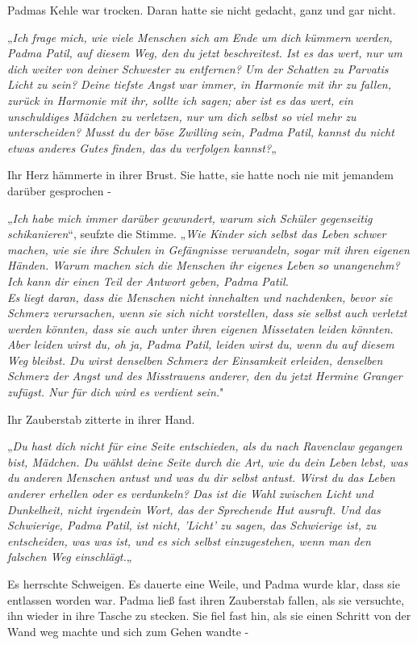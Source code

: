 {Padmas Kehle war trocken. Daran hatte sie nicht gedacht, ganz und gar nicht.

„\emph{Ich frage mich, wie viele Menschen sich am Ende um dich kümmern werden, Padma Patil, auf diesem Weg, den du jetzt beschreitest. Ist es das wert, nur um dich weiter von deiner Schwester zu entfernen? Um der Schatten zu Parvatis Licht zu sein? Deine tiefste Angst war immer, in Harmonie mit ihr zu fallen, zurück in Harmonie mit ihr, sollte ich sagen; aber ist es das wert, ein unschuldiges Mädchen zu verletzen, nur um dich selbst so viel mehr zu unterscheiden? Musst du der böse Zwilling sein, Padma Patil, kannst du nicht etwas anderes Gutes finden, das du verfolgen kannst?}„

Ihr Herz hämmerte in ihrer Brust. Sie hatte, sie hatte noch nie mit jemandem darüber gesprochen -

„\emph{Ich habe mich immer darüber gewundert, warum sich Schüler gegenseitig schikanieren}“, seufzte die Stimme. „\emph{Wie Kinder sich selbst das Leben schwer machen, wie sie ihre Schulen in Gefängnisse verwandeln, sogar mit ihren eigenen Händen. Warum machen sich die Menschen ihr eigenes Leben so unangenehm? Ich kann dir einen Teil der Antwort geben, Padma Patil.\\ } \emph{Es liegt daran, dass die Menschen nicht innehalten und nachdenken, bevor sie Schmerz verursachen, wenn sie sich nicht vorstellen, dass sie selbst auch verletzt werden könnten, dass sie auch unter ihren eigenen Missetaten leiden könnten.\\ Aber leiden wirst du, oh ja, Padma Patil, leiden wirst du, wenn du auf diesem Weg bleibst. Du wirst denselben Schmerz der Einsamkeit erleiden, denselben Schmerz der Angst und des Misstrauens anderer, den du jetzt Hermine Granger zufügst. Nur für dich wird es verdient sein.}"

Ihr Zauberstab zitterte in ihrer Hand.

„\emph{Du hast dich nicht für eine Seite entschieden, als du nach Ravenclaw gegangen bist, Mädchen. Du wählst deine Seite durch die Art, wie du dein Leben lebst, was du anderen Menschen antust und was du dir selbst antust. Wirst du das Leben anderer erhellen oder es verdunkeln? Das ist die Wahl zwischen Licht und Dunkelheit, nicht irgendein Wort, das der Sprechende Hut ausruft. Und das Schwierige, Padma Patil, ist nicht, 'Licht' zu sagen, das Schwierige ist, zu entscheiden, was was ist, und es sich selbst einzugestehen, wenn man den falschen Weg einschlägt.}„

Es herrschte Schweigen. Es dauerte eine Weile, und Padma wurde klar, dass sie entlassen worden war. Padma ließ fast ihren Zauberstab fallen, als sie versuchte, ihn wieder in ihre Tasche zu stecken. Sie fiel fast hin, als sie einen Schritt von der Wand weg machte und sich zum Gehen wandte -

}

